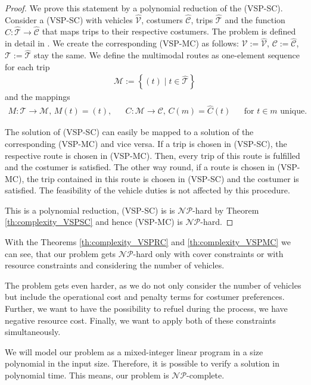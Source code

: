 \begin{proof}

We prove this statement by a polynomial reduction of the (VSP-SC). Consider a (VSP-SC) with vehicles $\hat{\mathcal{V}}$, costumers $\hat{\mathcal{C}}$, trips $\hat{\mathcal{T}}$ and the function $\hat{C}:\hat{\mathcal{T}}\to\hat{\mathcal{C}}$ that maps trips to their respective costumers. The problem is defined in detail in \cite[pp. 5-8]{Kaiser_Knoll}. We create the corresponding (VSP-MC) as follows: $\mathcal{V}:=\hat{\mathcal{V}}$, $\mathcal{C}:=\hat{\mathcal{C}}$, $\mathcal{T}:=\hat{\mathcal{T}}$ stay the same. We define the multimodal routes as one-element sequence for each trip
\begin{align*}
	\mathcal{M}:=\left\{(t)\mid t\in\hat{\mathcal{T}}\right\}
\end{align*}
and the mappings
\begin{align*}
	M:\mathcal{T}\to\mathcal{M} \text{, } M(t) = (t), && C:\mathcal{M}\to\mathcal{C} \text{, } C(m) = \hat{C}(t) && \text{for } t\in m \text{ unique.}
\end{align*}

The solution of (VSP-SC) can easily be mapped to a solution of the corresponding (VSP-MC) and vice versa. If a trip is chosen in (VSP-SC), the respective route is chosen in (VSP-MC). Then, every trip of this route is fulfilled and the costumer is satisfied. The other way round, if a route is chosen in (VSP-MC), the trip contained in this route is chosen in (VSP-SC) and the costumer is satisfied. The feasibility of the vehicle duties is not affected by this procedure.

This is a polynomial reduction, (VSP-SC) is is $\mathcal{NP}$-hard by Theorem \ref{th:complexity_VSPSC} and hence (VSP-MC) is $\mathcal{NP}$-hard.

\end{proof}

With the Theorems \ref{th:complexity_VSPRC} and \ref{th:complexity_VSPMC} we can see, that our problem gets $\mathcal{NP}$-hard only with cover constraints or with resource constraints and considering the number of vehicles.

The problem gets even harder, as we do not only consider the number of vehicles but include the operational cost and penalty terms for costumer preferences. Further, we want to have the possibility to refuel during the process, \ie we have negative resource cost. Finally, we want to apply both of these constraints simultaneously. 

We will model our problem as a mixed-integer linear program in a size polynomial in the input size. Therefore, it is possible to verify a solution in polynomial time. This means, our problem is $\mathcal{NP}$-complete.